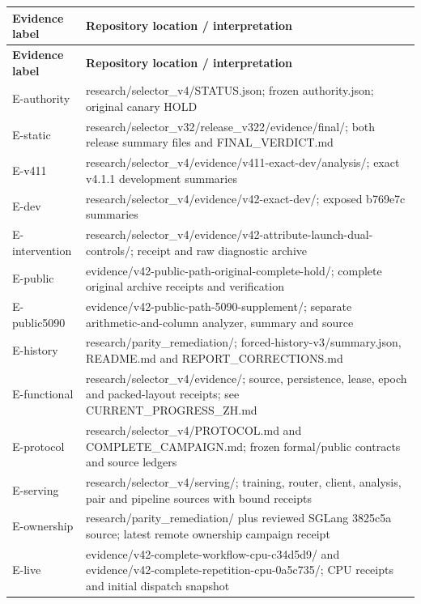 \documentclass[11pt,a4paper]{article}
\begin{document}
\begin{small}
\begin{longtable}{@{}p{3.2cm}p{11.5cm}@{}}
\toprule
\textbf{Evidence label} & \textbf{Repository location /\allowbreak{} interpretation} \\
\midrule\endfirsthead
\toprule
\textbf{Evidence label} & \textbf{Repository location /\allowbreak{} interpretation} \\
\midrule\endhead
E-authority & research/\allowbreak{}selector\_v4/\allowbreak{}STATUS.json; frozen authority.json; original canary HOLD \\
E-static & research/\allowbreak{}selector\_v32/\allowbreak{}release\_v322/\allowbreak{}evidence/\allowbreak{}final/\allowbreak{}; both release summary files and FINAL\_VERDICT.md \\
E-v411 & research/\allowbreak{}selector\_v4/\allowbreak{}evidence/\allowbreak{}v411-exact-dev/\allowbreak{}analysis/\allowbreak{}; exact v4.1.1 development summaries \\
E-dev & research/\allowbreak{}selector\_v4/\allowbreak{}evidence/\allowbreak{}v42-exact-dev/\allowbreak{}; exposed b769e7c summaries \\
E-intervention & research/\allowbreak{}selector\_v4/\allowbreak{}evidence/\allowbreak{}v42-attribute-launch-dual-controls/\allowbreak{}; receipt and raw diagnostic archive \\
E-public & evidence/\allowbreak{}v42-public-path-original-complete-hold/\allowbreak{}; complete original archive receipts and verification \\
E-public5090 & evidence/\allowbreak{}v42-public-path-5090-supplement/\allowbreak{}; separate arithmetic-and-column analyzer, summary and source \\
E-history & research/\allowbreak{}parity\_remediation/\allowbreak{}; forced-history-v3/\allowbreak{}summary.json, README.md and REPORT\_CORRECTIONS.md \\
E-functional & research/\allowbreak{}selector\_v4/\allowbreak{}evidence/\allowbreak{}; source, persistence, lease, epoch and packed-layout receipts; see CURRENT\_PROGRESS\_ZH.md \\
E-protocol & research/\allowbreak{}selector\_v4/\allowbreak{}PROTOCOL.md and COMPLETE\_CAMPAIGN.md; frozen formal/\allowbreak{}public contracts and source ledgers \\
E-serving & research/\allowbreak{}selector\_v4/\allowbreak{}serving/\allowbreak{}; training, router, client, analysis, pair and pipeline sources with bound receipts \\
E-ownership & research/\allowbreak{}parity\_remediation/\allowbreak{} plus reviewed SGLang 3825c5a source; latest remote ownership campaign receipt \\
E-live & evidence/\allowbreak{}v42-complete-workflow-cpu-c34d5d9/\allowbreak{} and evidence/\allowbreak{}v42-complete-repetition-cpu-0a5c735/\allowbreak{}; CPU receipts and initial dispatch snapshot \\
\bottomrule
\end{longtable}
\end{small}
\end{document}
